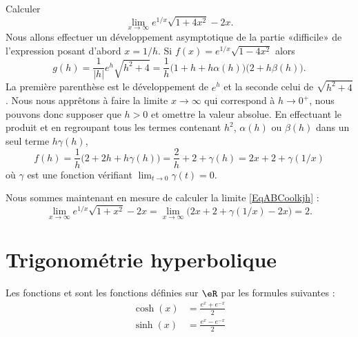 \begin{example}	\label{ExBCDookjljhjk}
    Calculer
    \begin{equation}\label{EqABCoolkjh}
        \lim_{x\to \infty}  e^{1/x}\sqrt{1+4x^2}-2x.
    \end{equation}
    Nous allons effectuer un développement asymptotique de la partie «difficile» de l'expression posant d'abord $x=1/h$. Si $f(x)=e^{1/x}\sqrt{1-4x^2}$ alors
    \begin{equation}
	g(h)=\frac{1}{|h|}e^h\sqrt{h^2+4}=\frac{1}{h}\big(  1+h+h\alpha(h) \big)\big( 2+h\beta(h) \big).
    \end{equation}
    La première parenthèse est le développement de $e^h$ et la seconde celui de $\sqrt{h^2+4}$. Nous nous apprêtons à faire la limite $x\to\infty$ qui correspond à $h\to 0^+$, nous pouvons donc supposer que $h>0$ et omettre la valeur absolue. En effectuant le produit et en regroupant tous les termes contenant $h^2$, $\alpha(h)$ ou $\beta(h)$ dans un seul terme $h\gamma(h)$,
    \begin{equation}
	f(h)=\frac{1}{h}\big(  2+2h+h\gamma(h) \big)=\frac{2}{h}+2+\gamma(h)=2x+2+\gamma(1/x)
    \end{equation}
    où $\gamma$ est une fonction vérifiant $\lim_{t\to 0}\gamma(t)=0$.

    Nous sommes maintenant en mesure de calculer la limite \eqref{EqABCoolkjh} :
    \begin{equation}
	\lim_{x\to\infty}e^{1/x}\sqrt{1+x^2}-2x= \lim_{x\to \infty}\big(  2x+2+\gamma(1/x)-2x \big)=2.
    \end{equation}
\end{example}

\section{Trigonométrie hyperbolique}

\begin{definition}
    Les fonctions  et  sont les fonctions définies sur $\eR$ par les formules suivantes :
    \begin{subequations}
        \begin{align}
            \cosh(x)&=\frac{  e^{x}+ e^{-x} }{2}\\
            \sinh(x)&=\frac{  e^{x}- e^{-x} }{2}
        \end{align}
    \end{subequations}
\end{definition}

